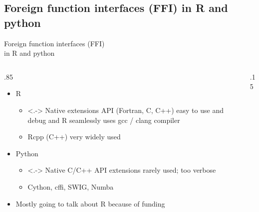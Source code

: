 \documentclass[
aspectratio=169,
xcolor={usenames}
]{beamer}
\begin{document}
\subsection{Foreign function interfaces (FFI) in R and python}
\begin{frame}{\hspace{8cm}Foreign function interfaces (FFI)\\%
    \hspace{8cm}in R and python}
  \begin{columns}[T]
    \begin{column}{.85\framewidth}
      \begin{itemize}[<+->]
      \item R
        \begin{itemize}
        \item<.-> Native extensions API (Fortran, C, C++) %
          easy to use and debug and %
          R seamlessly uses gcc / clang compiler
        \item Rcpp (C++) very widely used
        \end{itemize}
      \item Python
        \begin{itemize}
        \item<.-> Native C/C++ API extensions rarely used; too verbose
        \item Cython, cffi, SWIG, Numba
        \end{itemize}
      \item Mostly going to talk about R because of funding
      \end{itemize}
    \end{column}
    \begin{column}{.15\framewidth}
\end{column}
\end{columns}
\end{frame}
\end{document}
